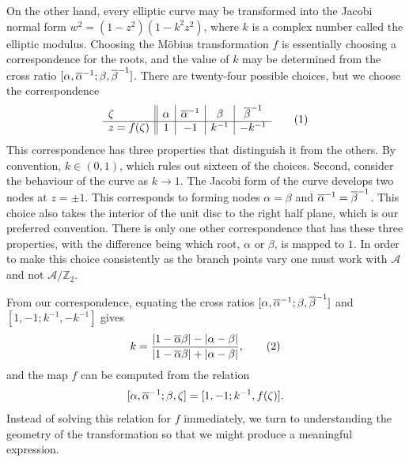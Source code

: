 \documentclass{article}
\begin{document}
On the other hand, every elliptic curve may be transformed into the Jacobi normal form $w^2 = (1-z^2)(1-k^2z^2)$, where $k$ is a complex number called the elliptic modulus. 
Choosing the M\"obius transformation $f$ is essentially choosing a correspondence for the roots, and the value of $k$ may be determined from the cross ratio $[\alpha,\overline{\alpha}^{-1};\beta,\overline{\beta}^{-1}]$.
There are twenty-four possible choices, but we choose the correspondence
\[
  \begin{array}{ l||c|c|c|c}
    \zeta & \alpha & \cji{\alpha} & \beta & \cji{\beta} \\
    \hline
    z = f(\zeta) & 1 & -1 & k^{-1} & -k^{-1}
  \end{array}
  \labelthis{eqn:choice f}
\]
This correspondence has three properties that distinguish it from the others. By convention, $k \in (0,1)$, which rules out sixteen of the choices. Second, consider the behaviour of the curve as $k\to 1$. The Jacobi form of the curve develops two nodes at $z=\pm 1$. This corresponds to forming nodes $\alpha=\beta$ and $\overline{\alpha}^{-1} = \overline{\beta}^{-1}$. This choice also takes the interior of the unit disc to the right half plane, which is our preferred convention. There is only one other correspondence that has these three properties, with the difference being which root, $\alpha$ or $\beta$, is mapped to $1$. In order to make this choice consistently as the branch points vary one must work with $\mathcal{A}$ and not $\mathcal{A}/\mathbb{Z}_2$.




From our correspondence, equating the cross ratios $[\alpha,\overline{\alpha}^{-1};\beta,\overline{\beta}^{-1}]$ and\\ $[1,-1;k^{-1},-k^{-1}]$ gives
\[
k = \frac{\abs{1-\bar{\alpha}\beta}-\abs{\alpha-\beta}}{\abs{1-\bar{\alpha}\beta}+\abs{\alpha-\beta}},
\labelthis{eqn:def_k}
\]
and the map $f$ can be computed from the relation
\[
[\alpha,\overline{\alpha}^{-1};\beta,\zeta] = [1,-1;k^{-1},f(\zeta)].
\]
Instead of solving this relation for $f$ immediately, we turn to understanding the geometry of the transformation so that we might produce a meaningful expression.
\end{document}
